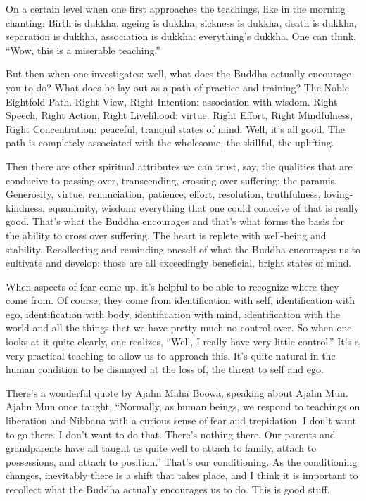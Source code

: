 On a certain level when one first approaches the teachings, like in the
morning chanting: Birth is dukkha, ageing is dukkha, sickness is dukkha,
death is dukkha, separation is dukkha, association is dukkha:
everything’s dukkha. One can think, “Wow, this is a miserable teaching.”

But then when one investigates: well, what does the Buddha actually
encourage you to do? What does he lay out as a path of practice and
training? The Noble Eightfold Path. Right View, Right Intention:
association with wisdom. Right Speech, Right Action, Right Livelihood:
virtue. Right Effort, Right Mindfulness, Right Concentration: peaceful,
tranquil states of mind. Well, it’s all good. The path is completely
associated with the wholesome, the skillful, the uplifting.

Then there are other spiritual attributes we can trust, say, the
qualities that are conducive to passing over, transcending, crossing
over suffering: the paramis. Generosity, virtue, renunciation, patience,
effort, resolution, truthfulness, loving-kindness, equanimity, wisdom:
everything that one could conceive of that is really good. That’s what
the Buddha encourages and that’s what forms the basis for the ability to
cross over suffering. The heart is replete with well-being and
stability. Recollecting and reminding oneself of what the Buddha
encourages us to cultivate and develop: those are all exceedingly
beneficial, bright states of mind.

When aspects of fear come up, it’s helpful to be able to recognize where
they come from. Of course, they come from identification with self,
identification with ego, identification with body, identification with
mind, identification with the world and all the things that we have
pretty much no control over. So when one looks at it quite clearly, one
realizes, “Well, I really have very little control.” It’s a very
practical teaching to allow us to approach this. It’s quite natural in
the human condition to be dismayed at the loss of, the threat to self
and ego.

There’s a wonderful quote by Ajahn Mahā Boowa, speaking about Ajahn Mun.
Ajahn Mun once taught, “Normally, as human beings, we respond to
teachings on liberation and Nibbana with a curious sense of fear and
trepidation. I don’t want to go there. I don’t want to do that. There’s
nothing there. Our parents and grandparents have all taught us quite
well to attach to family, attach to possessions, and attach to
position.” That’s our conditioning. As the conditioning changes,
inevitably there is a shift that takes place, and I think it is
important to recollect what the Buddha actually encourages us to do.
This is good stuff.

